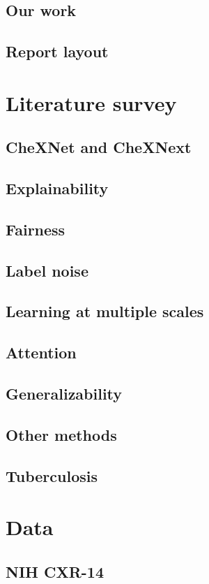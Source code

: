 \documentclass[11pt,twoside,a4paper]{report}
\begin{document}
    \section{Our work}
    \section{Report layout}
\chapter{Literature survey}
    \section{CheXNet and CheXNext}
    \section{Explainability}
    \section{Fairness}
    \section{Label noise}
    \section{Learning at multiple scales}
    \section{Attention}
    \section{Generalizability}
    \section{Other methods}
    \section{Tuberculosis}
\chapter{Data}
    \section{NIH CXR-14}
\end{document}
